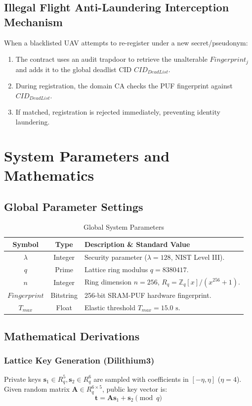 \documentclass[lettersize,journal]{IEEEtran}
\begin{document}
\subsection{Illegal Flight Anti-Laundering Interception Mechanism}
When a blacklisted UAV attempts to re-register under a new secret/pseudonym:
\begin{enumerate}
    \item The contract uses an audit trapdoor to retrieve the unalterable $Fingerprint_j$ and adds it to the global deadlist CID $CID_{DeadList}$.
    \item During registration, the domain CA checks the PUF fingerprint against $CID_{DeadList}$.
    \item If matched, registration is rejected immediately, preventing identity laundering.
\end{enumerate}
\section{System Parameters and Mathematics}
\subsection{Global Parameter Settings}
\begin{table}[!h]
\caption{Global System Parameters\label{tab:params}}
\centering
\begin{tabular}{c c p{4.2cm}}
\toprule
\textbf{Symbol} & \textbf{Type} & \textbf{Description \& Standard Value} \\
\midrule
$\lambda$ & Integer & Security parameter ($\lambda = 128$, NIST Level III). \\
$q$ & Prime & Lattice ring modulus $q = 8380417$. \\
$n$ & Integer & Ring dimension $n = 256$, $R_q = \mathbb{Z}_q[x]/(x^{256}+1)$. \\
$Fingerprint$ & Bitstring & 256-bit SRAM-PUF hardware fingerprint. \\
$T_{max}$ & Float & Elastic threshold $T_{max} = 15.0\text{ s}$. \\
\bottomrule
\end{tabular}
\end{table}
\subsection{Mathematical Derivations}
\subsubsection{Lattice Key Generation (Dilithium3)}
Private keys $\mathbf{s}_1 \in R_q^5, \mathbf{s}_2 \in R_q^6$ are sampled with coefficients in $[-\eta, \eta]$ ($\eta=4$). Given random matrix $\mathbf{A} \in R_q^{6 \times 5}$, public key vector is:
\begin{equation}
\mathbf{t} = \mathbf{A}\mathbf{s}_1 + \mathbf{s}_2 \pmod q
\end{equation}
\end{document}
